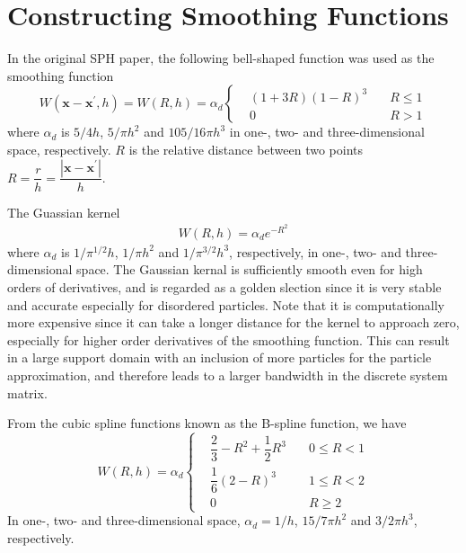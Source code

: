 \documentclass[letterpaper,12pt]{article}
\numberwithin{equation}{section}
\begin{document}
\section{Constructing Smoothing Functions}
In the original SPH paper, the following bell-shaped function was used as the smoothing function
\begin{equation}
    W(\mathbf{x} - \mathbf{x}^\prime, h) = W(R, h) = \alpha_d
    \left\{
        \begin{aligned}
            & (1 + 3R) (1 - R)^3 & \quad R \leq 1 \\
            & 0 & \quad R > 1
        \end{aligned}
    \right.
\end{equation}
where $\alpha_d$ is $5/4 h$, $5/\pi h^2$ and $105/16\pi h^3$ in one-, two- and three-dimensional space, respectively. $R$ is the relative distance between two points $R = \dfrac{r}{h} = \dfrac{|\mathbf{x} - \mathbf{x}^\prime|}{h}$.

The Guassian kernel
\begin{align}
    W(R, h) = \alpha_d e^{-R^2}
\end{align}
where $\alpha_d$ is $1/\pi^{1/2} h$, $1/\pi h^2$ and $1/\pi^{3/2} h^3$, respectively, in one-, two- and three-dimensional space. The Gaussian kernal is sufficiently smooth even for high orders of derivatives, and is regarded as a golden slection since it is very stable and accurate especially for disordered particles. Note that it is computationally more expensive since it can take a longer distance for the kernel to approach zero, especially for higher order derivatives of the smoothing function. This can result in a large support domain with an inclusion of more particles for the particle approximation, and therefore leads to a larger bandwidth in the discrete system matrix.

From the cubic spline functions known as the B-spline function, we have
\begin{equation}
    W(R, h) = \alpha_d
    \left\{
        \begin{aligned}
            & \dfrac23 - R^2 + \dfrac12 R^3 & \quad 0 \leq R < 1 \\
            & \dfrac16(2 - R)^3 & \quad 1 \leq R < 2 \\
            & 0 & \quad R \geq 2
        \end{aligned}
    \right.
\end{equation}
In one-, two- and three-dimensional space, $\alpha_d = 1/h$, $15/7\pi h^2$ and $3/2\pi h^3$, respectively.
\end{document}
